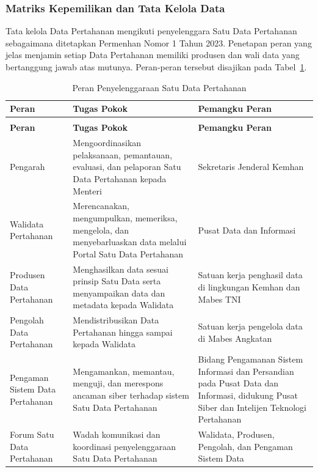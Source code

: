 \subsubsection{Matriks Kepemilikan dan Tata Kelola Data}

Tata kelola Data Pertahanan mengikuti penyelenggara Satu Data Pertahanan sebagaimana ditetapkan Permenhan Nomor 1 Tahun 2023. Penetapan peran yang jelas menjamin setiap Data Pertahanan memiliki produsen dan wali data yang bertanggung jawab atas mutunya. Peran-peran tersebut disajikan pada Tabel~\ref{tab:d4-15}.

\begin{longtable}{@{}>{\raggedright\arraybackslash}p{}>{\raggedright\arraybackslash}p{}>{\raggedright\arraybackslash}p{}@{}}
\caption{Peran Penyelenggaraan Satu Data Pertahanan}
\label{tab:d4-15}\\
\toprule
\textbf{Peran} & \textbf{Tugas Pokok} & \textbf{Pemangku Peran}\\
\midrule
\endfirsthead
\multicolumn{3}{@{}l}{\small\itshape \tablename\ \thetable{} (lanjutan)}\\
\toprule
\textbf{Peran} & \textbf{Tugas Pokok} & \textbf{Pemangku Peran}\\
\midrule
\endhead
\bottomrule
\endlastfoot
Pengarah & Mengoordinasikan pelaksanaan, pemantauan, evaluasi, dan pelaporan Satu Data Pertahanan kepada Menteri & Sekretaris Jenderal Kemhan\\
Walidata Pertahanan & Merencanakan, mengumpulkan, memeriksa, mengelola, dan menyebarluaskan data melalui Portal Satu Data Pertahanan & Pusat Data dan Informasi\\
Produsen Data Pertahanan & Menghasilkan data sesuai prinsip Satu Data serta menyampaikan data dan metadata kepada Walidata & Satuan kerja penghasil data di lingkungan Kemhan dan Mabes TNI\\
Pengolah Data Pertahanan & Mendistribusikan Data Pertahanan hingga sampai kepada Walidata & Satuan kerja pengelola data di Mabes Angkatan\\
Pengaman Sistem Data Pertahanan & Mengamankan, memantau, menguji, dan merespons ancaman siber terhadap sistem Satu Data Pertahanan & Bidang Pengamanan Sistem Informasi dan Persandian pada Pusat Data dan Informasi, didukung Pusat Siber dan Intelijen Teknologi Pertahanan\\
Forum Satu Data Pertahanan & Wadah komunikasi dan koordinasi penyelenggaraan Satu Data Pertahanan & Walidata, Produsen, Pengolah, dan Pengaman Sistem Data\\
\end{longtable}

